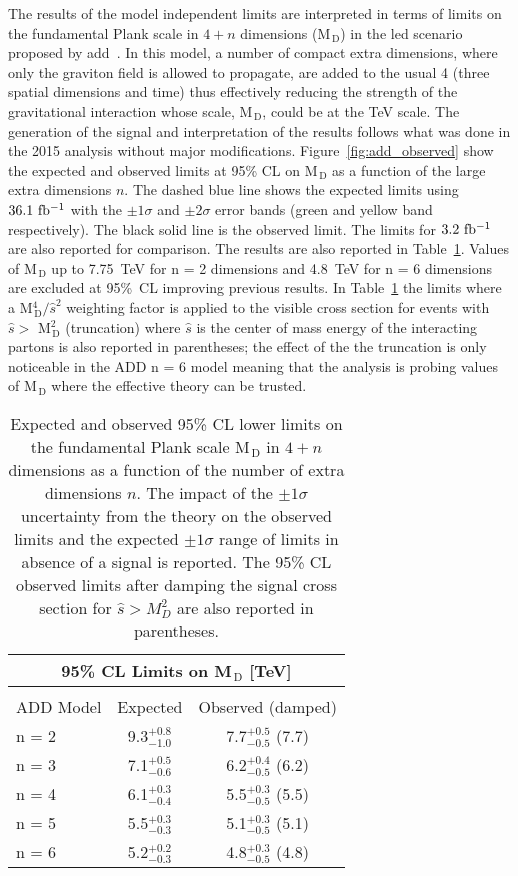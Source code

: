The results of the model independent limits are interpreted in terms of limits
on the fundamental Plank scale in $4 + n$ dimensions (M$_\mathrm{\, D}$) in the
\gls{led} scenario proposed by \gls{add}~\cite{ADDPaper}. In this model, a
number of compact extra dimensions, where only the graviton field is allowed to
propagate, are added to the usual 4 (three spatial dimensions and time) thus
effectively reducing the strength of the gravitational interaction whose scale,
M$_\mathrm{\, D}$, could be at the TeV scale. The generation of the signal and
interpretation of the results follows what was done in the 2015 analysis without
major modifications. Figure~\ref{fig:add_observed} show the expected and
observed limits at 95\% CL on M$_\mathrm{\, D}$ as a function of the large extra
dimensions $n$. The dashed blue line shows the expected limits using $36.1~\mbox{fb$^{-1}$}$
with the $\pm 1 \sigma$ and $\pm 2 \sigma$ error bands (green and yellow band
respectively). The black solid line is the observed limit. The limits for
$3.2~\mbox{fb$^{-1}$}$ are also reported for comparison. The results are also reported in
Table~\ref{tab:add_limits}. Values of M$_\mathrm{\, D}$ up to 7.75~TeV for n = 2
dimensions and 4.8~TeV for n = 6 dimensions are excluded at 95\%~CL improving
previous results. In Table~\ref{tab:add_limits} the limits where a
M$^4_\mathrm{\, D} / \hat{s}^2$ weighting factor is applied to the visible cross
section for events with $\hat{s} > $ M$^2_\mathrm{\, D}$ (truncation) where
$\hat{s}$ is the center of mass energy of the interacting partons is also
reported in parentheses; the effect of the the truncation is only noticeable in
the ADD n = 6 model meaning that the analysis is probing values of
M$_\mathrm{\, D}$ where the effective theory can be trusted.
\begin{table}[!hb]
  \centering
  \begin{tabular}{lcc}
    \toprule
    \multicolumn{3}{c}{95\% CL Limits on M$_\mathrm{\, D}$
    [TeV]} \\
    \midrule \midrule \\
    ADD Model & Expected & Observed (damped) \\
    n = 2 & 9.3$^{+0.8}_{-1.0}$ & 7.7$^{+0.5}_{-0.5}$ (7.7) \B \\
    n = 3 & 7.1$^{+0.5}_{-0.6}$ & 6.2$^{+0.4}_{-0.5}$ (6.2) \T \B \\
    n = 4 & 6.1$^{+0.3}_{-0.4}$ & 5.5$^{+0.3}_{-0.5}$ (5.5) \T \B \\
    n = 5 & 5.5$^{+0.3}_{-0.3}$ & 5.1$^{+0.3}_{-0.5}$ (5.1) \T \B \\
    n = 6 & 5.2$^{+0.2}_{-0.3}$ & 4.8$^{+0.3}_{-0.5}$ (4.8) \T \\
    \bottomrule
  \end{tabular}
  \caption{Expected and observed 95\% CL lower limits on the fundamental Plank
      scale M$_\mathrm{\, D}$ in $4 + n$ dimensions as a function of the number
      of extra dimensions $n$. The impact of the $\pm 1 \sigma$ uncertainty from
      the theory on the observed limits and the expected $\pm 1 \sigma$ range of
      limits in absence of a signal is reported. The 95\% CL observed limits
      after damping the signal cross section for $\hat{s} > M_D^2$ are also
      reported in parentheses.}
  \label{tab:add_limits}
\end{table}
